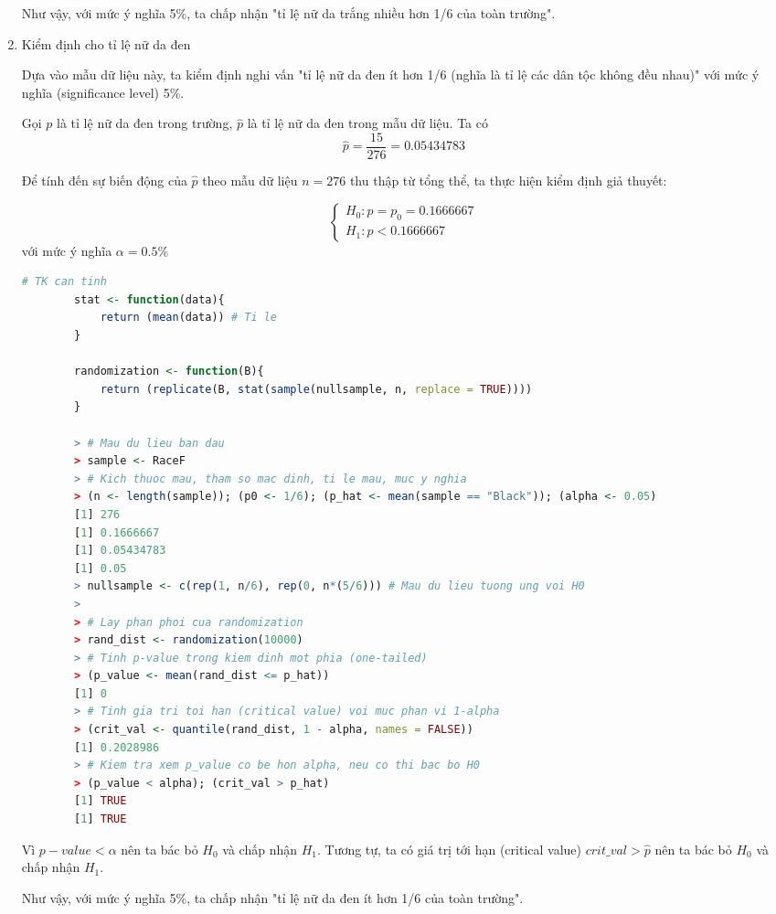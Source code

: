 \documentclass[a4paper,12pt]{article}
\begin{document}
\begin{enumerate}[label = \alph*)]
		Như vậy, với mức ý nghĩa 5\%, ta chấp nhận "tỉ lệ nữ da trắng nhiều hơn 1/6 của toàn trường". 
		
		\item Kiểm định cho tỉ lệ nữ da đen
		
		Dựa vào mẫu dữ liệu này, ta kiểm định nghi vấn "tỉ lệ nữ da đen ít hơn 1/6 (nghĩa là tỉ lệ các dân tộc không đều nhau)" với mức ý nghĩa (significance level) 5\%.
		
		Gọi $p$ là tỉ lệ nữ da đen trong trường, $\hat{p}$ là tỉ lệ nữ da đen trong mẫu dữ liệu. Ta có
		$$\hat{p} = \frac{15}{276} = 0.05434783$$
		
		Để tính đến sự biến động của $\hat{p}$ theo mẫu dữ liệu $n = 276$ thu thập từ tổng thể, ta thực hiện kiểm định giả thuyết:
		
		\begin{equation*}
		\begin{cases}
		H_0: p = p_0 = 0.1666667\\
		H_1: p < 0.1666667
		\end{cases}
		\end{equation*}
		với mức ý nghĩa $\alpha = 0.5\%$
		
		\begin{lstlisting}[language=R]
		# TK can tinh
		stat <- function(data){
			return (mean(data)) # Ti le
		}
		
		randomization <- function(B){
			return (replicate(B, stat(sample(nullsample, n, replace = TRUE))))
		}
		
		> # Mau du lieu ban dau
		> sample <- RaceF
		> # Kich thuoc mau, tham so mac dinh, ti le mau, muc y nghia
		> (n <- length(sample)); (p0 <- 1/6); (p_hat <- mean(sample == "Black")); (alpha <- 0.05)
		[1] 276
		[1] 0.1666667
		[1] 0.05434783
		[1] 0.05
		> nullsample <- c(rep(1, n/6), rep(0, n*(5/6))) # Mau du lieu tuong ung voi H0
		> 
		> # Lay phan phoi cua randomization
		> rand_dist <- randomization(10000)
		> # Tinh p-value trong kiem dinh mot phia (one-tailed)
		> (p_value <- mean(rand_dist <= p_hat))
		[1] 0
		> # Tinh gia tri toi han (critical value) voi muc phan vi 1-alpha
		> (crit_val <- quantile(rand_dist, 1 - alpha, names = FALSE))
		[1] 0.2028986
		> # Kiem tra xem p_value co be hon alpha, neu co thi bac bo H0
		> (p_value < alpha); (crit_val > p_hat)
		[1] TRUE
		[1] TRUE
		\end{lstlisting}
		
		Vì $p-value < \alpha$ nên ta bác bỏ $H_0$ và chấp nhận $H_1$. Tương tự, ta có giá trị tới hạn (critical value) $crit\_val > \hat{p}$ nên ta bác bỏ $H_0$ và chấp nhận $H_1$. 
		
		Như vậy, với mức ý nghĩa 5\%, ta chấp nhận "tỉ lệ nữ da đen ít hơn 1/6 của toàn trường". 
	\end{enumerate}
		
\end{document}
